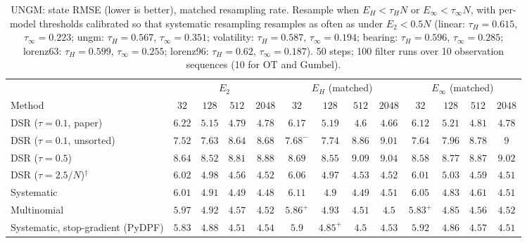 \begin{table}[ht]
\centering
\small
\caption{UNGM: state RMSE (lower is better), matched resampling rate. Resample when $E_H<\tau_HN$ or $E_\infty<\tau_\infty N$, with per-model thresholds calibrated so that systematic resampling resamples as often as under $E_2<0.5N$ (linear: $\tau_H{=}0.615$, $\tau_\infty{=}0.223$; ungm: $\tau_H{=}0.567$, $\tau_\infty{=}0.351$; volatility: $\tau_H{=}0.587$, $\tau_\infty{=}0.194$; bearing: $\tau_H{=}0.596$, $\tau_\infty{=}0.285$; lorenz63: $\tau_H{=}0.599$, $\tau_\infty{=}0.255$; lorenz96: $\tau_H{=}0.62$, $\tau_\infty{=}0.187$). 50 steps; 100 filter runs over 10 observation sequences (10 for OT and Gumbel).}
\label{tab:trigger-matched-ungm-rmse}
\begin{adjustbox}{max width=\linewidth}
\begin{tabular}{lcccc|cccc|cccc}
\toprule
 & \multicolumn{4}{c}{$E_2$} & \multicolumn{4}{c}{$E_H$ (matched)} & \multicolumn{4}{c}{$E_\infty$ (matched)} \\
\cmidrule(lr){2-5} \cmidrule(lr){6-9} \cmidrule(lr){10-13}
Method & $32$ & $128$ & $512$ & $2048$ & $32$ & $128$ & $512$ & $2048$ & $32$ & $128$ & $512$ & $2048$ \\
\midrule
DSR ($\tau{=}0.1$, paper) & $6.22$ & $\mathbf{5.15}$ & $4.79$ & $4.78$ & $6.17$ & $5.19$ & $\mathbf{4.6}$ & $\mathbf{4.66}$ & $\mathbf{6.12}$ & $5.21$ & $4.81$ & $4.78$ \\
DSR ($\tau{=}0.1$, unsorted) & $\mathbf{7.52}$ & $\mathbf{7.63}$ & $\mathbf{8.64}$ & $\mathbf{8.68}$ & $7.68^{-}$ & $7.74$ & $8.86$ & $9.01$ & $7.64$ & $7.96$ & $8.78$ & $9$ \\
DSR ($\tau{=}0.5$) & $8.64$ & $\mathbf{8.52}$ & $\mathbf{8.81}$ & $\mathbf{8.88}$ & $8.69$ & $8.55$ & $9.09$ & $9.04$ & $\mathbf{8.58}$ & $8.77$ & $8.87$ & $9.02$ \\
DSR ($\tau{=}2.5/N$)$^\dagger$ & $6.02$ & $4.98$ & $4.56$ & $4.52$ & $6.06$ & $\mathbf{4.97}$ & $\mathbf{4.53}$ & $4.52$ & $\mathbf{6.01}$ & $5.03$ & $4.59$ & $\mathbf{4.51}$ \\
\midrule
Systematic & $\mathbf{6.01}$ & $4.91$ & $4.49$ & $\mathbf{4.48}$ & $6.11$ & $4.9$ & $\mathbf{4.49}$ & $4.51$ & $6.05$ & $\mathbf{4.83}$ & $4.61$ & $4.51$ \\
Multinomial & $5.97$ & $4.92$ & $4.57$ & $4.52$ & $5.86^{+}$ & $4.93$ & $\mathbf{4.51}$ & $\mathbf{4.5}$ & $\mathbf{5.83}^{+}$ & $\mathbf{4.85}$ & $4.56$ & $4.52$ \\
Systematic, stop-gradient (PyDPF) & $\mathbf{5.83}$ & $4.88$ & $4.51$ & $4.54$ & $5.9$ & $\mathbf{4.85}^{+}$ & $\mathbf{4.5}$ & $4.53$ & $5.92$ & $4.86$ & $4.57$ & $\mathbf{4.51}$ \\

\end{tabular}
\end{adjustbox}
\end{table}
